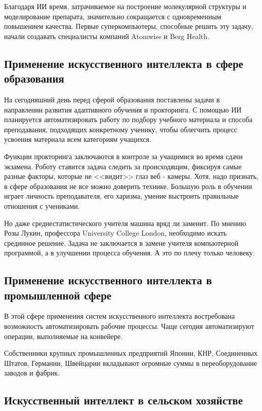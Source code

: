 \documentclass[bachelor,och,referat]{SCWorks_corrected}
\begin{document}
Благодаря ИИ время, затрачиваемое на построение молекулярной структуры и моделирование препарата, значительно сокращается с одновременным повышением качества. Первые суперкомпьютеры, способные решить эту задачу, начали создавать специалисты компаний Atomwise и Berg Health.\cite{N13}

\subsection{Применение искусственного интеллекта в сфере образования}
    
На сегодняшний день перед сферой образования поставлены задачи в направлении развития адаптивного обучения и прокторинга. С помощью ИИ планируется автоматизировать работу по подбору учебного материала и способа преподавания, подходящих конкретному ученику, чтобы облегчить процесс усвоения материала всем категориям учащихся.

Функции прокторинга заключаются в контроле за учащимися во время сдачи экзамена. Роботу ставится задача следить за происходящим, фиксируя самые разные факторы, которые не <<видит>> глаз веб - камеры. Хотя, надо признать, в сфере образования не все можно доверить технике. Большую роль в обучении играет личность преподавателя, его харизма, умение выстроить правильные отношения с учениками.

Но даже среднестатистического учителя машина вряд ли заменит. По мнению Розы Лукин, профессора University College London, необходимо искать срединное решение. Задача не заключается в замене учителя компьютерной программой, а в улучшении процесса обучения. А это по плечу только человеку.

\subsection{Применение искусственного интеллекта в промышленной сфере}
    
В этой сфере применения систем искусственного интеллекта востребована возможность автоматизировать рабочие процессы. Чаще сегодня автоматизируют операции, выполняемые на конвейере.

Собственники крупных промышленных предприятий Японии, КНР, Соединенных Штатов, Германии, Швейцарии вкладывают огромные суммы в переоборудование заводов и фабрик. 

\subsection{Искусственный интеллект в сельском хозяйстве}
    
\end{document}
